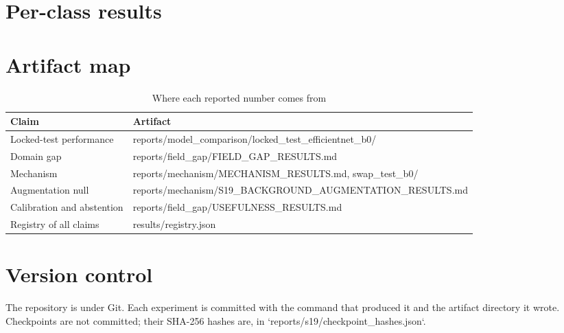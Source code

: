 \section{Per-class results}

\begin{center}

\end{center}

\begin{center}

\end{center}

\section{Artifact map}

\begin{table}[H]
\centering
\caption{Where each reported number comes from}
\label{tab:artifacts}
\tabfont
\begin{tabularx}{\textwidth}{@{}lY@{}}
\toprule
\textbf{Claim} & \textbf{Artifact} \\
\midrule
Locked-test performance & reports/model\_comparison/locked\_test\_efficientnet\_b0/ \\
Domain gap & reports/field\_gap/FIELD\_GAP\_RESULTS.md \\
Mechanism & reports/mechanism/MECHANISM\_RESULTS.md, swap\_test\_b0/ \\
Augmentation null & reports/mechanism/S19\_BACKGROUND\_AUGMENTATION\_RESULTS.md \\
Calibration and abstention & reports/field\_gap/USEFULNESS\_RESULTS.md \\
Registry of all claims & results/registry.json \\
\bottomrule
\end{tabularx}
\end{table}

\section{Version control}

The repository is under Git. Each experiment is committed with the command that
produced it and the artifact directory it wrote. Checkpoints are not committed;
their SHA-256 hashes are, in `reports/s19/checkpoint\_hashes.json`.
